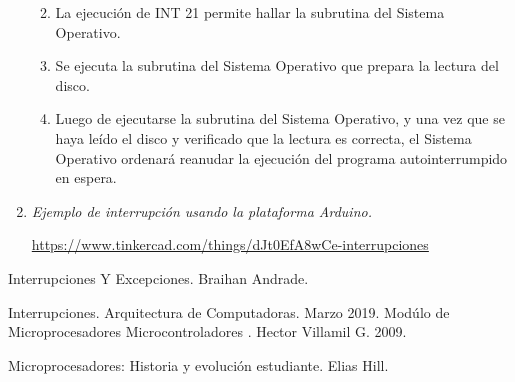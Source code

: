 \documentclass[a4paper,12pt]{article}
\begin{document}
\begin{enumerate}
\begin{enumerate}
\newpage
\item La ejecución de INT 21 permite hallar la subrutina del Sistema Operativo.
\item Se ejecuta la subrutina del Sistema Operativo que prepara la lectura del disco.
\item Luego de ejecutarse la subrutina del Sistema Operativo, y una vez que se haya leído el disco y verificado que la lectura es correcta, el Sistema Operativo ordenará reanudar la ejecución del programa autointerrumpido en espera.


\end{enumerate}
\item {\it Ejemplo de interrupción usando la plataforma Arduino.}

\url{https://www.tinkercad.com/things/dJt0EfA8wCe-interrupciones}


 

\end{enumerate}
\begin{thebibliography}{99}

 Interrupciones Y Excepciones. Braihan Andrade.

Interrupciones. Arquitectura de Computadoras. Marzo 2019.
Modúlo de Microprocesadores Microcontroladores
. Hector Villamil G. 2009.

Microprocesadores: Historia y evolución estudiante. Elias Hill. 


\end{thebibliography}
\end{document}
